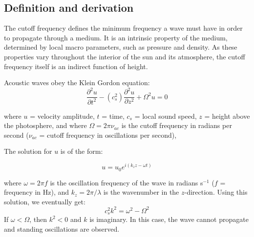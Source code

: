 
\clearpage
\subsection{Definition and derivation}

The cutoff frequency defines the minimum frequency a wave must have in order to
propagate through a medium.
It is an intrinsic property of the medium,
determined by local macro parameters, such as pressure and density.
As these properties vary throughout the interior of the sun and its atmosphere,
the cutoff frequency itself is an indirect function of height.


Acoustic waves obey the Klein Gordon equation:
\begin{equation}
    \frac{\partial^{2}u}{\partial t^{2}}
    - \left( c_{s}^{2} \right)
    \frac{\partial^{2}u}{\partial z^{2}}
    + \Omega^{2}u
    = 0
\end{equation}

where
$u$ = velocity amplitude,
$t$ = time,
$c_{s}$ = local sound speed,
$z$ = height above the photosphere, and
where $\Omega = 2\pi\nu_{ac}$
is the cutoff frequency in radians per second
($\nu_{ac}$ = cutoff frequency in oscillations per second),


The solution for $u$ is of the form:

\begin{equation}
    u = u_{0}e^{i\left( k_{z}z - \omega t \right)}
\end{equation}

where $\omega = 2 \pi f$ is the oscillation frequency of the wave
in radians s$^{-1}$ ($f$ = frequency in Hz), and $k_{z} = 2\pi/\lambda$
is the wavenumber in the $z$-direction.
Using this solution, we eventually get:
\begin{equation}
    c_{s}^{2} k^{2} = \omega^{2} - \Omega^{2}
\end{equation}
If $\omega < \Omega$, then $k^{2} < 0$ and $k$ is imaginary.
In this case, the wave cannot propagate and standing oscillations are
observed.

